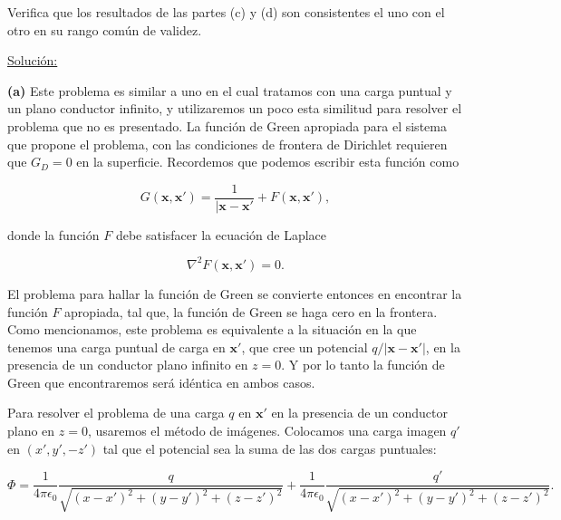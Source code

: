 \documentclass[a4paper,11pt]{article}
\numberwithin{equation}{section}
\begin{document}
Verifica que los resultados de las partes (c) y (d) son consistentes el uno 
con el otro en su rango común de validez.

\vspace{.3cm}

\underline{Solución:} \vspace{.3cm}

\textbf{(a)} Este problema es similar a uno en el cual tratamos con una carga puntual y un plano 
conductor infinito, y utilizaremos un poco esta similitud para resolver el problema 
que no es presentado. La función de Green apropiada para el sistema que propone el 
problema, con las condiciones de frontera de Dirichlet requieren que $G_D = 0$ en la 
superficie. Recordemos que podemos escribir esta función como 

\begin{equation}
 G(\mathbf{x},\mathbf{x}') = \frac{1}{|\mathbf{x} - \mathbf{x}'} + 
 F(\mathbf{x},\mathbf{x}'),
\end{equation}

donde la función $F$ debe satisfacer la ecuación de Laplace 

\begin{equation}
 \nabla^2F(\mathbf{x},\mathbf{x}') = 0.
\end{equation}

El problema para hallar la función de Green se convierte entonces en encontrar 
la función $F$ apropiada, tal que, la función de Green se haga cero en la frontera. 
Como mencionamos, este problema es equivalente a la situación en la que tenemos una 
carga puntual de carga en $\mathbf{x}'$, que cree un potencial $q/|\mathbf{x}-
\mathbf{x}'|$, en la presencia de un conductor plano infinito en $z = 0$. Y por lo 
tanto la función de Green que encontraremos será idéntica en ambos casos. 

\vspace{.3cm}

Para resolver el problema de una carga $q$ en $\mathbf{x}'$ en la presencia de un 
conductor plano en $z = 0$, usaremos el método de imágenes. Colocamos una carga 
imagen $q'$ en $(x',y',-z')$ tal que el potencial sea la suma de las dos cargas 
puntuales:

\begin{equation*}
 \Phi = \frac{1}{4\pi\epsilon_0}\frac{q}{\sqrt{(x-x')^2 + (y-y')^2 + (z-z')^2}} + 
 \frac{1}{4\pi\epsilon_0}\frac{q'}{\sqrt{(x-x')^2 + (y-y')^2 + (z-z')^2}}.
\end{equation*}
\end{document}
